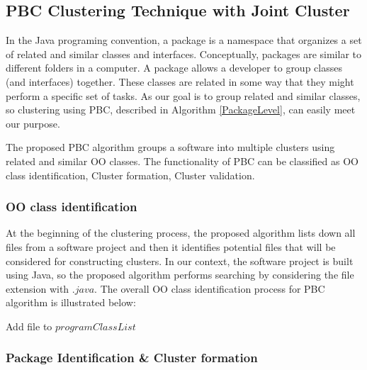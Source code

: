 \documentclass[12pt]{report}
\begin{document}
\subsection{PBC Clustering Technique with Joint Cluster}

In the Java programing convention, a package is a namespace that organizes a set of related and similar classes and interfaces. Conceptually, packages are similar to different folders in a computer. A package allows a developer to group classes (and interfaces) together. These classes are related in some way that they might perform a specific set of tasks. As our goal is to group related and similar classes, so clustering using PBC, described in  Algorithm \ref{PackageLevel}, can easily meet our purpose.

The proposed PBC algorithm groups a software into multiple clusters using related and similar OO classes. The functionality of PBC can be classified as OO class identification, Cluster formation, Cluster validation.

\subsubsection{OO class identification}

At the beginning of the clustering process, the proposed algorithm lists down all files from a software project and then it identifies potential files that will be considered for constructing clusters.  In our context, the software project is built using Java, so the proposed algorithm performs searching by considering the file extension with $.java$. 
The overall OO class identification process for PBC algorithm is illustrated below:   
\begin{algorithm}
\label{OO_class_identification}
\begin{algorithmic}[1]

				\STATE Add file to $programClassList$
		\ENDIF
	\ENDFOR

\end{algorithmic}
\end{algorithm}


\subsubsection{ Package Identification \&  Cluster formation}
\end{document}
